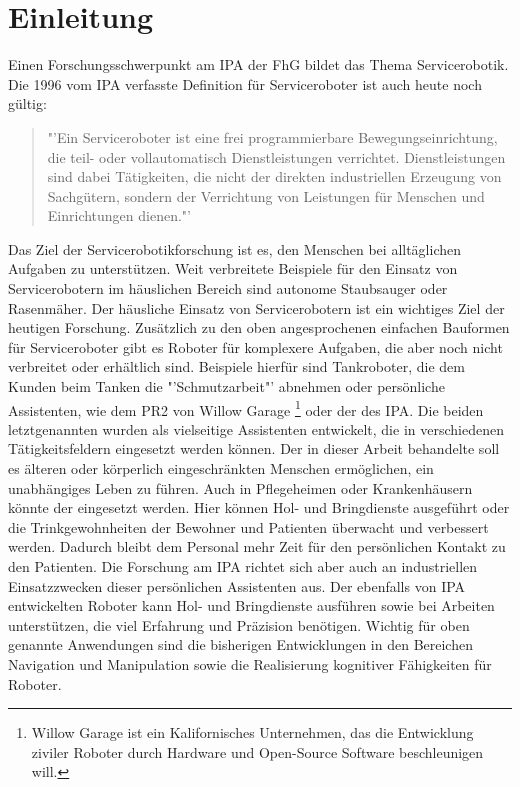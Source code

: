 
\chapter{Einleitung}
Einen Forschungsschwerpunkt am \ac{IPA} der \ac{FhG} bildet das Thema 
Servicerobotik. Die 1996 vom \ac{IPA} verfasste Definition für Serviceroboter 
ist auch heute noch gültig:

\begin{quote}"'Ein Serviceroboter ist 
eine frei programmierbare Bewegungseinrichtung, die teil- oder vollautomatisch 
Dienstleistungen verrichtet. Dienstleistungen sind dabei Tätigkeiten, die nicht 
der direkten industriellen Erzeugung von Sachgütern, sondern der Verrichtung von 
Leistungen für Menschen und Einrichtungen dienen."'\cite{Schraft1996}\end{quote} 

Das Ziel der Servicerobotikforschung ist es, den Menschen bei alltäglichen Aufgaben zu 
unterstützen. Weit verbreitete Beispiele für den Einsatz von Servicerobotern im 
häuslichen Bereich sind autonome Staubsauger oder Rasenmäher. Der häusliche 
Einsatz von Servicerobotern ist ein wichtiges Ziel der heutigen Forschung. 
Zusätzlich zu den oben angesprochenen einfachen Bauformen für Serviceroboter 
gibt es Roboter für komplexere Aufgaben, die aber noch nicht verbreitet oder 
erhältlich sind. Beispiele hierfür sind Tankroboter, die dem Kunden beim Tanken 
die "'Schmutzarbeit"'\nocite{tankpitstop} abnehmen oder persönliche Assistenten, 
wie dem PR2 von Willow Garage \footnote{Willow Garage ist ein Kalifornisches 
Unternehmen, das die Entwicklung ziviler Roboter durch Hardware und Open-Source
Software beschleunigen will.} oder der \cob des \ac{IPA}. Die beiden letztgenannten 
wurden als vielseitige Assistenten entwickelt, die in verschiedenen 
Tätigkeitsfeldern eingesetzt werden können. Der in dieser Arbeit behandelte \cob 
soll es älteren oder körperlich eingeschränkten Menschen ermöglichen, ein 
unabhängiges Leben zu führen. Auch in Pflegeheimen oder 
Krankenhäusern könnte der \cob eingesetzt werden. Hier können Hol- und Bringdienste ausgeführt oder die 
Trinkgewohnheiten der Bewohner und Patienten überwacht und verbessert werden. Dadurch 
bleibt dem Personal mehr Zeit für den persönlichen Kontakt zu den Patienten. Die 
Forschung am \ac{IPA} richtet sich aber auch an industriellen Einsatzzwecken 
dieser persönlichen Assistenten aus. Der ebenfalls von \ac{IPA} entwickelten 
Roboter \raw kann Hol- und Bringdienste ausführen sowie bei Arbeiten unterstützen, 
die viel Erfahrung und Präzision benötigen. Wichtig für oben genannte Anwendungen 
sind die bisherigen Entwicklungen in den Bereichen Navigation und Manipulation 
sowie die Realisierung kognitiver Fähigkeiten für Roboter.

